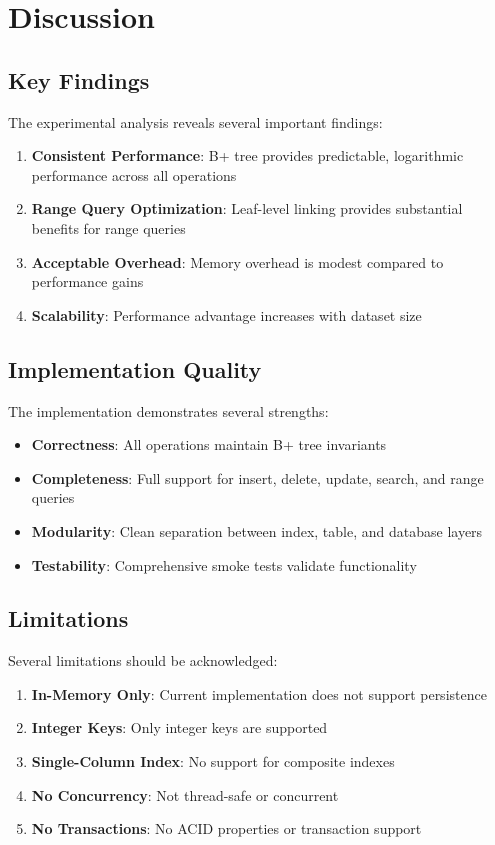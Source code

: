 \documentclass[conference]{IEEEtran}
\begin{document}
\section{Discussion}

\subsection{Key Findings}

The experimental analysis reveals several important findings:

\begin{enumerate}
    \item \textbf{Consistent Performance}: B+ tree provides predictable, logarithmic performance across all operations
    \item \textbf{Range Query Optimization}: Leaf-level linking provides substantial benefits for range queries
    \item \textbf{Acceptable Overhead}: Memory overhead is modest compared to performance gains
    \item \textbf{Scalability}: Performance advantage increases with dataset size
\end{enumerate}

\subsection{Implementation Quality}

The implementation demonstrates several strengths:

\begin{itemize}
    \item \textbf{Correctness}: All operations maintain B+ tree invariants
    \item \textbf{Completeness}: Full support for insert, delete, update, search, and range queries
    \item \textbf{Modularity}: Clean separation between index, table, and database layers
    \item \textbf{Testability}: Comprehensive smoke tests validate functionality
\end{itemize}

\subsection{Limitations}

Several limitations should be acknowledged:

\begin{enumerate}
    \item \textbf{In-Memory Only}: Current implementation does not support persistence
    \item \textbf{Integer Keys}: Only integer keys are supported
    \item \textbf{Single-Column Index}: No support for composite indexes
    \item \textbf{No Concurrency}: Not thread-safe or concurrent
    \item \textbf{No Transactions}: No ACID properties or transaction support
\end{enumerate}
\end{document}
